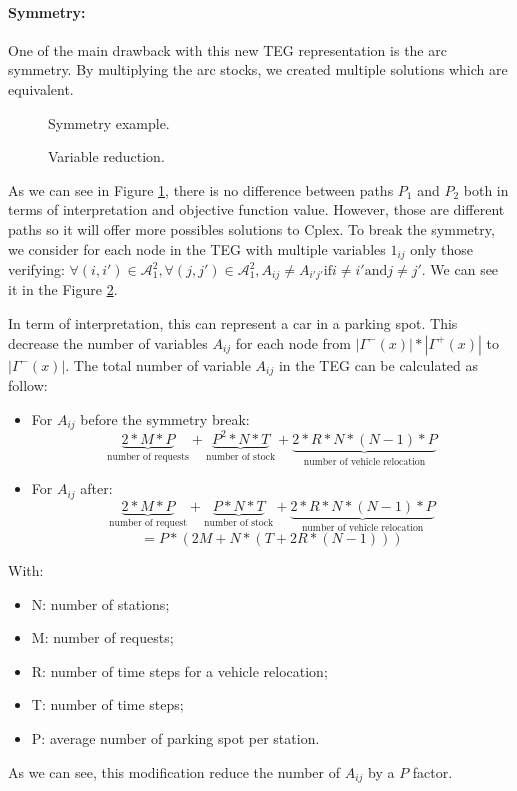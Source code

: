 \begin{bibunit}[ieeetr]
\paragraph{Symmetry:}
One of the main drawback with this new TEG representation is the arc symmetry.
By multiplying the arc stocks, we created multiple solutions which are equivalent.

\begin{figure}[t]
\begin{center}
\scalebox{1}{}
\end{center}
\caption{Symmetry example.}
\label{fig:symetryExample}
\end{figure}

\begin{figure}[t]
\begin{center}
\scalebox{1}{}
\end{center}
\caption{Variable reduction.}
\label{fig:variableReduction}
\end{figure}

As we can see in Figure \ref{fig:symetryExample}, there is no difference between paths $P_1$ and $P_2$ both in terms of interpretation and objective function value.
However, those are different paths so it will offer more possibles solutions to Cplex.
To break the symmetry, we consider for each node in the TEG with multiple variables $1_{ij}$ only those verifying: $\forall (i, i\prime) \in \mathcal{A}_1^{2},\forall (j, j\prime) \in \mathcal{A}_1^{2}, A_{ij} \neq A_{i\prime j\prime} \text{if} i \neq i\prime \text{and} j\neq j\prime $.
We can see it in the Figure \ref{fig:variableReduction}.

In term of interpretation, this can represent a car in a parking spot.
This decrease the number of variables $A_{ij}$ for each node from $|\Gamma^{-}(x)|*|\Gamma^{+}(x)|$ to $|\Gamma^{-}(x)|$.
The total number of variable $A_{ij}$ in the TEG can be calculated as follow: 

\begin{itemize}
\item
For $A_{ij}$ before the symmetry break: $$\underbrace{2 * M * P }_\textrm{number of requests} + \underbrace{P^{2} * N * T}_\textrm{number of stock} + \underbrace{2* R * N * (N -1) * P}_\textrm{number of vehicle relocation}$$
\item
For $A_{ij}$ after: $$\underbrace{2 * M * P }_\textrm{number of request} + \underbrace{P * N * T}_\textrm{number of stock} + \underbrace{2* R * N * (N -1) * P}_\textrm{number of vehicle relocation}$$
$$ = P * ( 2M + N * (T + 2R * (N-1)))$$
\end{itemize}
With:
\begin{itemize}
\item N: number of stations;
\item M: number of requests;
\item R: number of time steps for a vehicle relocation;
\item T: number of time steps;
\item P: average number of parking spot per station.
\end{itemize}
As we can see, this modification reduce the number of $A_{ij}$ by a $P$ factor.


\end{bibunit}
